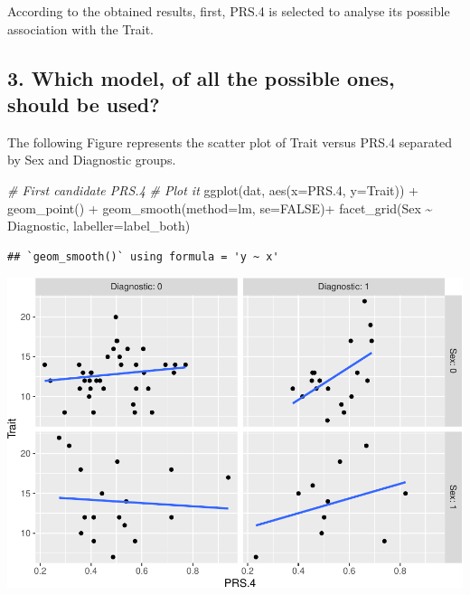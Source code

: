 \documentclass[
]{article}
\newenvironment{Shaded}{\begin{snugshade}}{\end{snugshade}}
\newcommand{\AttributeTok}[1]{\textcolor[rgb]{0.77,0.63,0.00}{#1}}
\newcommand{\CommentTok}[1]{\textcolor[rgb]{0.56,0.35,0.01}{\textit{#1}}}
\newcommand{\ConstantTok}[1]{\textcolor[rgb]{0.00,0.00,0.00}{#1}}
\newcommand{\FloatTok}[1]{\textcolor[rgb]{0.00,0.00,0.81}{#1}}
\newcommand{\FunctionTok}[1]{\textcolor[rgb]{0.00,0.00,0.00}{#1}}
\newcommand{\NormalTok}[1]{#1}
\newcommand{\SpecialCharTok}[1]{\textcolor[rgb]{0.00,0.00,0.00}{#1}}
\begin{document}
According to the obtained results, first, PRS.4 is selected to analyse
its possible association with the Trait.

\hypertarget{which-model-of-all-the-possible-ones-should-be-used}{%
\subsection{3. Which model, of all the possible ones, should be
used?}\label{which-model-of-all-the-possible-ones-should-be-used}}

The following Figure represents the scatter plot of Trait versus PRS.4
separated by Sex and Diagnostic groups.

\begin{Shaded}
\begin{Highlighting}[]
\CommentTok{\# First candidate PRS.4}
\CommentTok{\# Plot it}
\FunctionTok{ggplot}\NormalTok{(dat, }\FunctionTok{aes}\NormalTok{(}\AttributeTok{x=}\NormalTok{PRS}\FloatTok{.4}\NormalTok{, }\AttributeTok{y=}\NormalTok{Trait)) }\SpecialCharTok{+}
  \FunctionTok{geom\_point}\NormalTok{() }\SpecialCharTok{+}
  \FunctionTok{geom\_smooth}\NormalTok{(}\AttributeTok{method=}\NormalTok{lm, }\AttributeTok{se=}\ConstantTok{FALSE}\NormalTok{)}\SpecialCharTok{+}
  \FunctionTok{facet\_grid}\NormalTok{(Sex }\SpecialCharTok{\textasciitilde{}}\NormalTok{ Diagnostic, }\AttributeTok{labeller=}\NormalTok{label\_both)}
\end{Highlighting}
\end{Shaded}

\begin{verbatim}
## `geom_smooth()` using formula = 'y ~ x'
\end{verbatim}

\includegraphics{WorkingExample1_code_files/figure-latex/unnamed-chunk-6-1.pdf}
\end{document}
